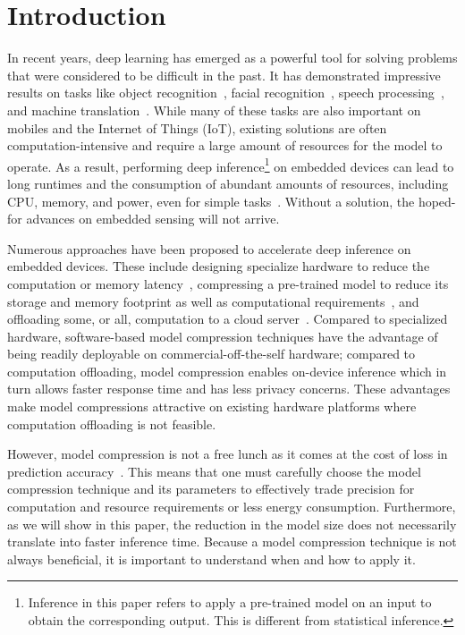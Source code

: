 \section{Introduction}
In recent years, deep learning has emerged as a powerful tool for solving problems that were considered to be difficult in the past. It has
demonstrated impressive results on tasks like object recognition~\cite{donahue14,he2016deep}, facial
recognition~\cite{parkhi2015deep,sun2014deep}, speech processing~\cite{pmlrv48amodei16}, and machine translation~\cite{bahdanau2014neural}.
While many of these tasks are also important on mobiles and the Internet of Things (IoT), existing solutions are often
computation-intensive and require a large amount of resources for the model to operate. As a result, performing deep
inference\footnote{Inference in this paper refers to apply a pre-trained model on an input to obtain the corresponding output. This is
different from statistical inference.} on embedded devices can lead to long runtimes and the consumption of abundant amounts of resources,
including CPU, memory, and power, even for simple tasks~\cite{CanzianiPC16}. Without a solution,
 the hoped-for advances on embedded sensing will not arrive.


Numerous approaches have been proposed to accelerate deep inference on embedded devices. These include designing specialize hardware to
reduce the computation or memory latency~\cite{georgiev2017low}, compressing a pre-trained model to reduce its storage and memory footprint as well as
computational requirements~\cite{han2016eie}, and offloading some, or all, computation to a cloud
server~\cite{Kang2017neurosurgeon,teerapittayanon2017distributed}. Compared to specialized hardware, software-based model compression
techniques have the advantage of being readily deployable on commercial-off-the-self hardware; compared to computation offloading, model
compression enables on-device inference which in turn allows faster response time and has less privacy concerns. These advantages make
model compressions attractive on existing hardware platforms where computation offloading is not feasible.


However, model compression is not a free lunch as it comes at the cost of loss in prediction accuracy~\cite{cheng2017survey}. This means that one must
carefully choose the model compression technique and its parameters to effectively trade precision for computation and resource
requirements or less energy consumption. Furthermore, as we will show in this paper, the reduction in the model size does not necessarily
translate into faster inference time. Because a model compression technique is not always beneficial, it is important to understand when
and how to apply it.

